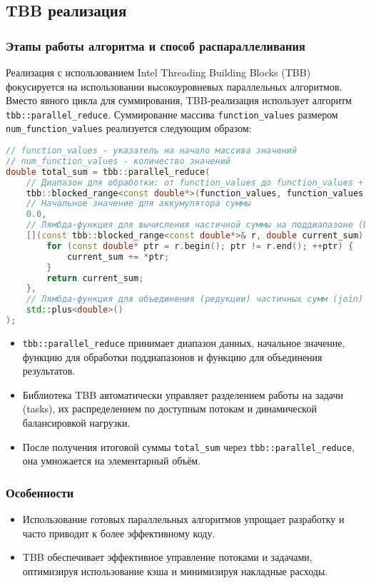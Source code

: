 \documentclass[12pt]{article}
\begin{document}
\subsection{TBB реализация}
\subsubsection*{Этапы работы алгоритма и способ распараллеливания}
Реализация с использованием Intel Threading Building Blocks (TBB) фокусируется на использовании высокоуровневых параллельных алгоритмов. Вместо явного цикла для суммирования, TBB-реализация использует алгоритм \texttt{tbb::parallel\_reduce}. Суммирование массива \texttt{function\_values} размером \texttt{num\_function\_values} реализуется следующим образом:
\begin{lstlisting}[language=C++, basicstyle=\small\ttfamily, frame=none, numbers=none]
// function_values - указатель на начало массива значений
// num_function_values - количество значений
double total_sum = tbb::parallel_reduce(
    // Диапазон для обработки: от function_values до function_values + num_function_values
    tbb::blocked_range<const double*>(function_values, function_values + num_function_values),
    // Начальное значение для аккумулятора суммы
    0.0,
    // Лямбда-функция для вычисления частичной суммы на поддиапазоне (body)
    [](const tbb::blocked_range<const double*>& r, double current_sum) -> double {
        for (const double* ptr = r.begin(); ptr != r.end(); ++ptr) {
            current_sum += *ptr;
        }
        return current_sum;
    },
    // Лямбда-функция для объединения (редукции) частичных сумм (join)
    std::plus<double>()
);
\end{lstlisting}
\begin{itemize}
    \item \texttt{tbb::parallel\_reduce} принимает диапазон данных, начальное значение, функцию для обработки поддиапазонов и функцию для объединения результатов.
    \item Библиотека TBB автоматически управляет разделением работы на задачи (tasks), их распределением по доступным потокам и динамической балансировкой нагрузки.
    \item После получения итоговой суммы \texttt{total\_sum} через \texttt{tbb::parallel\_reduce}, она умножается на элементарный объём.
\end{itemize}

\subsubsection*{Особенности}
\begin{itemize}
  \item Использование готовых параллельных алгоритмов упрощает разработку и часто приводит к более эффективному коду.
  \item TBB обеспечивает эффективное управление потоками и задачами, оптимизируя использование кэша и минимизируя накладные расходы.
\end{itemize}
\end{document}
